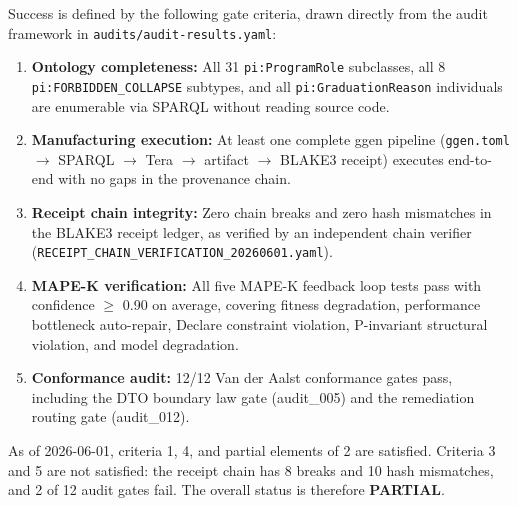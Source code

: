 Success is defined by the following gate criteria, drawn directly from the audit framework in \texttt{audits/audit-results.yaml}:

\begin{enumerate}
  \item \textbf{Ontology completeness:} All 31 \texttt{pi:ProgramRole} subclasses, all 8 \texttt{pi:FORBIDDEN\_COLLAPSE} subtypes, and all \texttt{pi:GraduationReason} individuals are enumerable via SPARQL without reading source code.
  \item \textbf{Manufacturing execution:} At least one complete ggen pipeline (\texttt{ggen.toml} $\to$ SPARQL $\to$ Tera $\to$ artifact $\to$ BLAKE3 receipt) executes end-to-end with no gaps in the provenance chain.
  \item \textbf{Receipt chain integrity:} Zero chain breaks and zero hash mismatches in the BLAKE3 receipt ledger, as verified by an independent chain verifier (\texttt{RECEIPT\_CHAIN\_VERIFICATION\_20260601.yaml}).
  \item \textbf{MAPE-K verification:} All five MAPE-K feedback loop tests pass with confidence $\geq$ 0.90 on average, covering fitness degradation, performance bottleneck auto-repair, Declare constraint violation, P-invariant structural violation, and model degradation.
  \item \textbf{Conformance audit:} 12/12 Van der Aalst conformance gates pass, including the DTO boundary law gate (audit\_005) and the remediation routing gate (audit\_012).
\end{enumerate}

As of 2026-06-01, criteria 1, 4, and partial elements of 2 are satisfied. Criteria 3 and 5 are not satisfied: the receipt chain has 8 breaks and 10 hash mismatches, and 2 of 12 audit gates fail. The overall status is therefore \textbf{PARTIAL}.
